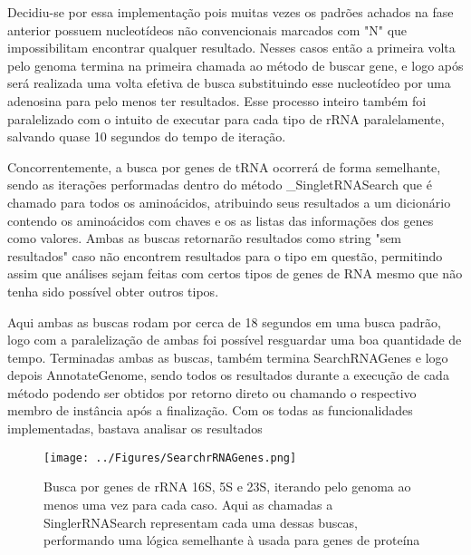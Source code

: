 \documentclass[brazilian,12pt,a4paper,final]{article}
\begin{document}
	\vspace{0.5cm}
	
	Decidiu-se por essa implementação pois muitas vezes os padrões achados na fase anterior possuem nucleotídeos não convencionais marcados com "N" que impossibilitam encontrar qualquer resultado. Nesses casos então a primeira volta pelo genoma termina na primeira chamada ao método de buscar gene, e logo após será realizada uma volta efetiva de busca substituindo esse nucleotídeo por uma adenosina para pelo menos ter resultados. Esse processo inteiro também foi paralelizado com o intuito de executar para cada tipo de rRNA paralelamente, salvando quase 10 segundos do tempo de iteração.
	
	\vspace{0.5cm}
	
	Concorrentemente, a busca por genes de tRNA ocorrerá de forma semelhante, sendo as iterações performadas dentro do método \_SingletRNASearch que é chamado para todos os aminoácidos, atribuindo seus resultados a um dicionário contendo os aminoácidos com chaves e os as listas das informações dos genes como valores. Ambas as buscas retornarão resultados como string "sem resultados" caso não encontrem resultados para o tipo em questão, permitindo assim que análises sejam feitas com certos tipos de genes de RNA mesmo que não tenha sido possível obter outros tipos.
	
	\vspace{0.5cm}
	
	Aqui ambas as buscas rodam por cerca de 18 segundos em uma busca padrão, logo com a paralelização de ambas foi possível resguardar uma boa quantidade de tempo. Terminadas ambas as buscas, também termina SearchRNAGenes e logo depois AnnotateGenome, sendo todos os resultados durante a execução de cada método podendo ser obtidos por retorno direto ou chamando o respectivo membro de instância após a finalização.
	Com os todas as funcionalidades implementadas, bastava analisar os resultados
	
	
	\begin{figure}[hbtp]
		\begin{center}
			\texttt{[image: ../Figures/SearchrRNAGenes.png]}
			\caption{Busca por genes de rRNA 16S, 5S e 23S, iterando pelo genoma ao menos uma vez para cada caso. Aqui as chamadas a SinglerRNASearch representam cada uma dessas buscas, performando uma lógica semelhante à usada para genes de proteína}
			\label{fig}
		\end{center}
	\end{figure}
	
\end{document}
